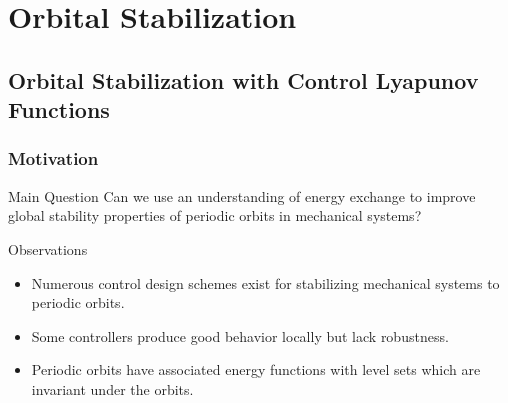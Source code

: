 \documentclass{beamer}
\newcommand{\showtoc}{
  \frame{
    \frametitle{Overview}
    \tableofcontents[sectionstyle=show/shaded,subsectionstyle=hide]
  }
}
\begin{document}
\section{Orbital Stabilization}
\showtoc

\subsection{Orbital Stabilization with Control Lyapunov Functions}
\begin{frame}
  \frametitle{Motivation}
  \begin{block}{Main Question}
    Can we use an understanding of energy exchange to improve global stability properties of periodic orbits in mechanical systems?
  \end{block}

  \begin{block}{Observations}
    \begin{itemize}
    \item Numerous control design schemes exist for stabilizing mechanical systems to periodic orbits.
    \item Some controllers produce good behavior locally but lack robustness.
    \item Periodic orbits have associated energy functions with level sets which are invariant under the orbits.
    \end{itemize}
  \end{block}
\end{frame}
\end{document}
